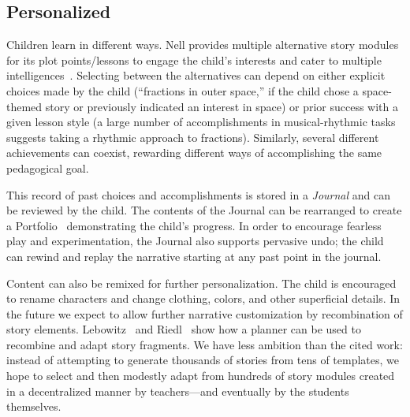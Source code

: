 \documentclass[preprint]{sig-alternate}
\begin{document}

\subsection{Personalized}


Children learn in different ways.  Nell provides multiple alternative
story modules for its plot points/lessons to engage the child's
interests and cater to multiple intelligences~\cite{gardner:mi}.
Selecting between the alternatives can depend on either explicit
choices made by the child (``fractions in outer space,'' if the child
chose a space-themed story or previously indicated an interest in space)
or prior success with a given
lesson style (a large number of accomplishments in musical-rhythmic
tasks suggests taking a rhythmic approach to fractions).  Similarly, several
different achievements can coexist, rewarding different ways of
accomplishing the same pedagogical goal.

This record of past choices and accomplishments is stored in a
\textit{Journal} and can be reviewed by the child.  The contents of the
Journal can be rearranged to create a Portfolio~\cite{stefanakis:portfolios}
demonstrating the child's progress.
In order to encourage fearless play and experimentation, the Journal
also supports pervasive undo; the child can rewind and replay the
narrative starting at any past point in the journal.

Content can also be remixed for further personalization.
The child is encouraged to rename characters and change clothing,
colors, and other superficial details.  In the future
we expect to allow further narrative customization by
recombination of story elements.
Lebowitz~\cite{lebowitz:universe85} and Riedl~\cite{riedl:planning}
show how a planner can be used to recombine and adapt story fragments.
We have less ambition than the cited work: instead of
attempting to generate thousands of stories from tens of templates, we
hope to select and then modestly adapt from hundreds of story
modules created in a decentralized manner by teachers---and eventually
by the students themselves.
\end{document}
